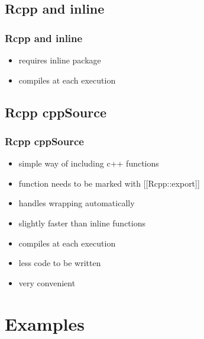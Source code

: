 \documentclass[hyperef={
    colorlinks=true,
    linkcolor=blue,
    filecolor=black,
urlcolor=blue}
]{beamer}
\begin{document}
\subsection{Rcpp and inline}
\begin{frame}
    \frametitle{Rcpp and inline}
\begin{itemize}
    \item requires inline package 
    \item compiles at each execution
\end{itemize}
\end{frame}

\subsection{Rcpp cppSource}
\begin{frame}
    \frametitle{Rcpp cppSource}
\begin{itemize}
    \item simple way of including c++ functions
    \item function needs to be marked with [[Rcpp::export]]
    \item handles wrapping automatically
    \item slightly faster than inline functions
    \item compiles at each execution
    \item less code to be written
    \item very convenient
\end{itemize}
\end{frame}

\section{Examples}
\end{document}
